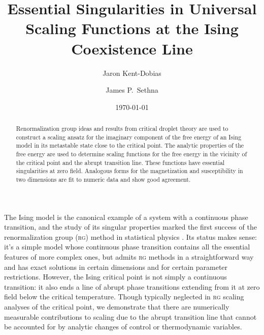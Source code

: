 \documentclass[aps,prl,reprint]{revtex4-1}
\begin{document}
\title{Essential Singularities in Universal Scaling Functions at the Ising Coexistence Line}
\author{Jaron Kent-Dobias}
\author{James P.~Sethna}

\date\today

\begin{abstract}
  Renormalization group ideas and results from critical droplet theory are
  used to construct a scaling ansatz for the imaginary component of the free
  energy of an Ising model in its metastable state close to the critical
  point. The analytic properties of the free energy are used to determine
  scaling functions for the free energy in the vicinity of the critical point
  and the abrupt transition line. These functions have essential singularities
  at zero field. Analogous forms for the magnetization and susceptibility in
  two dimensions are fit to numeric data and show good agreement.
\end{abstract}

\maketitle

The Ising model is the canonical example of a system with a continuous phase
transition, and the study of its singular properties marked the first success
of the renormalization group (\textsc{rg}) method in statistical physics
\cite{wilson.1971.renormalization}. Its status makes sense: it's a simple
model whose continuous phase transition contains all the essential features of
more complex ones, but admits \textsc{rg} methods in a straightforward way and
has exact solutions in certain dimensions and for certain parameter
restrictions. However, the Ising critical point is not simply a continuous
transition: it also ends a line of abrupt phase transitions extending from it
at zero field below the critical temperature. Though typically neglected in
\textsc{rg} scaling analyses of the critical point, we demonstrate that there
are numerically measurable contributions to scaling due to the abrupt
transition line that cannot be accounted for by analytic changes of control or
thermodynamic variables.
\end{document}
